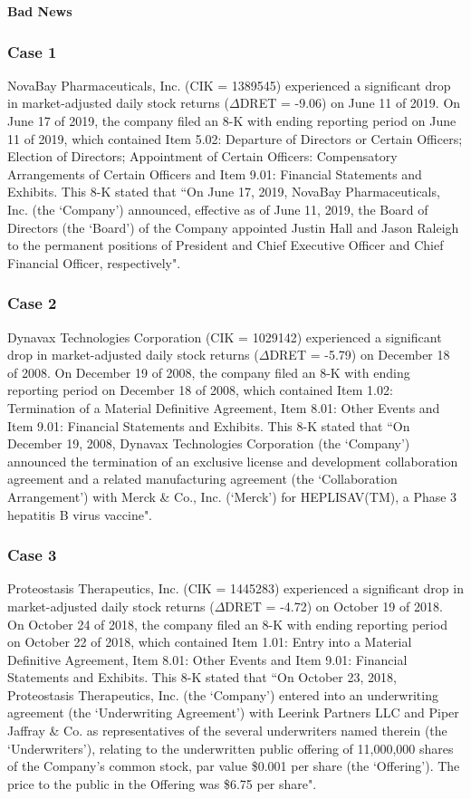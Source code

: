 \begin{small}
\newpage
\begin{center}
	\textbf{Bad News}
\end{center}
\subsubsection*{Case 1}
NovaBay Pharmaceuticals, Inc. (CIK = 1389545) experienced a significant drop in market-adjusted daily stock returns ($\Delta$DRET = -9.06) on June 11 of 2019. On June 17 of 2019, the company filed an 8-K with ending reporting period on June 11 of 2019, which contained Item 5.02: Departure of Directors or Certain Officers; Election of Directors; Appointment of Certain Officers: Compensatory Arrangements of Certain Officers and Item 9.01: Financial Statements and Exhibits. This 8-K stated that ``On June 17, 2019, NovaBay Pharmaceuticals, Inc. (the `Company') announced, effective as of June 11, 2019, the Board of Directors (the `Board') of the Company appointed Justin Hall and Jason Raleigh to the permanent positions of President and Chief Executive Officer and Chief Financial Officer, respectively".
\subsubsection*{Case 2}
Dynavax Technologies Corporation (CIK = 1029142) experienced a significant drop in market-adjusted daily stock returns ($\Delta$DRET = -5.79) on December 18 of 2008. On December 19 of 2008, the company filed an 8-K with ending reporting period on December 18 of 2008, which contained Item 1.02: Termination of a Material Definitive Agreement, Item 8.01: Other Events and Item 9.01: Financial Statements and Exhibits. This 8-K stated that ``On December 19, 2008, Dynavax Technologies Corporation (the `Company') announced the termination of an exclusive license and development collaboration agreement and a related manufacturing agreement (the `Collaboration Arrangement') with Merck \& Co., Inc. (`Merck') for HEPLISAV(TM), a Phase 3 hepatitis B virus vaccine". 
\subsubsection*{Case 3}
Proteostasis Therapeutics, Inc. (CIK = 1445283) experienced a significant drop in market-adjusted daily stock returns ($\Delta$DRET = -4.72) on October 19 of 2018. On October 24 of 2018, the company filed an 8-K with ending reporting period on October 22 of 2018, which contained Item 1.01: Entry into a Material Definitive Agreement, Item 8.01: Other Events and Item 9.01: Financial Statements and Exhibits. This 8-K stated that ``On October 23, 2018, Proteostasis Therapeutics, Inc. (the `Company') entered into an underwriting agreement (the `Underwriting Agreement') with Leerink Partners LLC and Piper Jaffray \& Co. as representatives of the several underwriters named therein (the `Underwriters'), relating to the underwritten public offering of 11,000,000 shares of the Company’s common stock, par value \$0.001 per share (the `Offering'). The price to the public in the Offering was \$6.75 per share". 

\end{small}
